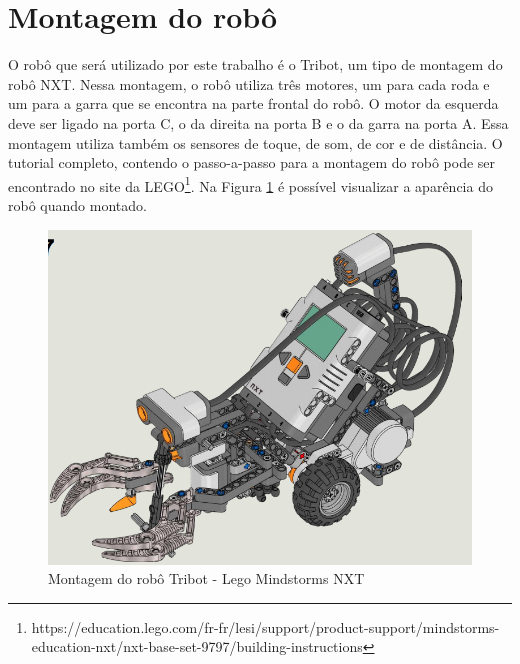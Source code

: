 \section{Montagem do robô}
O robô que será utilizado por este trabalho é o Tribot, um tipo de montagem do robô NXT. Nessa montagem, o robô utiliza três motores, um para cada roda e um para a garra que se encontra na parte frontal do robô. O motor da esquerda deve ser ligado na porta C, o da direita na porta B e o da garra na porta A. Essa montagem utiliza também os sensores de toque, de som, de cor e de distância. O tutorial completo, contendo o passo-a-passo para a montagem do robô pode ser encontrado no site da LEGO\footnote{https://education.lego.com/fr-fr/lesi/support/product-support/mindstorms-education-nxt/nxt-base-set-9797/building-instructions}. Na Figura \ref{tribot} é possível visualizar a aparência do robô quando montado. 

\FloatBarrier
\begin{figure}[!h]
\centering
\includegraphics[keepaspectratio=true,scale=0.5]{figuras/tribot.png}
\caption{Montagem do robô Tribot - Lego Mindstorms NXT}
\label{tribot}
\end{figure}


